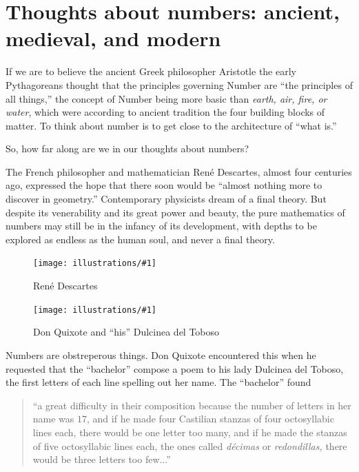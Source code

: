 \documentclass[11pt,draft]{article}
\newcommand{\ill}[3]{ 
   \begin{figure}[H]
   \begin{center}
   \texttt{[image: illustrations/\#1]}
   \caption{#3}
   \end{center}
    \end{figure}
}
\theoremstyle{plain}
\theoremstyle{definition}
\numberwithin{equation}{section}
\numberwithin{figure}{section}
\numberwithin{table}{section}
\begin{document}
\section{Thoughts about numbers: ancient, medieval, and modern}

If we are to believe the ancient Greek philosopher Aristotle the early
Pythagoreans thought that the principles governing Number are ``the
principles of all things,'' the concept of Number being more basic than
{\em earth, air, fire, or water}, which were according to ancient tradition
the four building blocks of matter. To think about number is to get
close to the architecture of ``what is.''

So, how far along are we in our thoughts about numbers?

The French philosopher and mathematician Ren\'e Descartes, almost four
centuries ago, expressed the hope that there soon would be ``almost
nothing more to discover in geometry.'' Contemporary physicists dream
of a final theory.  But despite its
venerability and its great power and beauty, the pure mathematics of
numbers may still be in the infancy of its development, with depths to
be explored as endless as the human soul, and never a final theory.



\ill{descartes}{.3}{Ren\'e Descartes}


\ill{dulcinea1.jpg}{.2}{Don Quixote and ``his'' Dulcinea del Toboso}

Numbers are obstreperous things. Don Quixote encountered this when he
requested that the ``bachelor'' compose a poem to his lady Dulcinea del
Toboso, the first letters of each line spelling out her name. The
``bachelor'' found

\bigskip


\begin{quote}
  ``a great difficulty in their composition because the number of
  letters in her name was $17$, and if he made four Castilian stanzas
  of four octosyllabic lines each, there would be one letter too many,
  and if he made the stanzas of five octosyllabic lines each, the ones
  called {\em d{\'e}cimas} or {\em redondillas,} there would be three
  letters too few...''
\end{quote}
  
\end{document}
